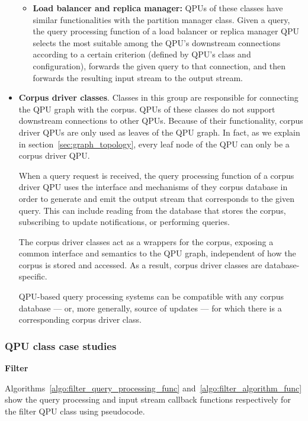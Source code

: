 \begin{itemize}
\begin{itemize}
    \item \textbf{Load balancer and replica manager:}
    QPUs of these classes have similar functionalities with the partition manager class.
    Given a query, the query processing function of a load balancer or replica manager QPU selects the most suitable
    among the QPU's downstream connections according to a certain criterion (defined by QPU's class and configuration),
    forwards the given query to that connection, and then forwards the resulting input stream to the output stream.
    \end{itemize}

  \item \textbf{Corpus driver classes}.
  Classes in this group are responsible for connecting the QPU graph with the corpus.
  QPUs of these classes do not support downstream connections to other QPUs.
  Because of their functionality, corpus driver QPUs are only used as leaves of the QPU graph.
  In fact, as we explain in section~\ref{sec:graph_topology}, every leaf node of the QPU can only be a corpus driver QPU.

  When a query request is received, the query processing function of a corpus driver QPU uses the interface and mechanisms
  of they corpus database in order to generate and emit the output stream that corresponds to the given query.
  This can include reading from the database that stores the corpus, subscribing to update notifications,
  or performing queries.

  The corpus driver classes act as a wrappers for the corpus, exposing a common interface and semantics to the
  QPU graph, independent of how the corpus is stored and accessed.
  As a result, corpus driver classes are database-specific.

  QPU-based query processing systems can be compatible with any corpus database --- or, more generally, source of updates ---
  for which there is a corresponding corpus driver class.
\end{itemize}

\subsubsection{QPU class case studies}
\label{sec:qpu_class_examples}

\textbf{Filter}

Algorithms~\ref{algo:filter_query_processing_func} and~\ref{algo:filter_algorithm_func} show the query processing and
input stream callback functions respectively for the filter QPU class using pseudocode.


